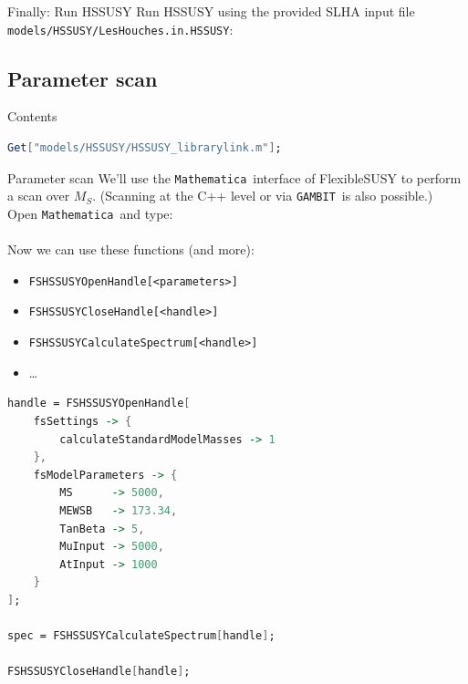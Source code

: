 \documentclass[hyperref={pdfpagelabels=false},ngerman]{beamer}
\newcommand{\MS}{\ensuremath{M_S}}
\newcommand{\Mathematica}{\texttt{Mathematica}}
\newcommand{\GAMBIT}{\texttt{GAMBIT}}
\begin{document}
\begin{frame}{Finally: Run HSSUSY}
  Run HSSUSY using the provided SLHA input file
  \lstinline{models/HSSUSY/LesHouches.in.HSSUSY}:\\[2em]
  \usebox{\listbox}
\end{frame}

\subsection{Parameter scan}

\begin{frame}{Contents}
  \tableofcontents[currentsubsection,sectionstyle=show/shaded]  
\end{frame}

\begin{lrbox}{\listbox}\begin{lstlisting}[language=Mathematica]
Get["models/HSSUSY/HSSUSY_librarylink.m"];
\end{lstlisting}\end{lrbox} %

\begin{frame}{Parameter scan}
  We'll use the \Mathematica\ interface of FlexibleSUSY to perform a
  scan over $\MS$.  (Scanning at the C++ level or via \GAMBIT\ is also possible.)\\[1em]
  Open \Mathematica\ and type:\\[2em]
  \usebox{\listbox}
  \\[1em]
  Now we can use these functions (and more):\\
  \begin{itemize}
  \item[] \texttt{FSHSSUSYOpenHandle[<parameters>]}
  \item[] \texttt{FSHSSUSYCloseHandle[<handle>]}
  \item[] \texttt{FSHSSUSYCalculateSpectrum[<handle>]}
  \item[] \ldots
  \end{itemize}
\end{frame}

\begin{lrbox}{\listbox}\begin{lstlisting}[language=Mathematica]
handle = FSHSSUSYOpenHandle[
    fsSettings -> {
        calculateStandardModelMasses -> 1
    },
    fsModelParameters -> {
        MS      -> 5000,
        MEWSB   -> 173.34,
        TanBeta -> 5,
        MuInput -> 5000,
        AtInput -> 1000
    }
];

spec = FSHSSUSYCalculateSpectrum[handle];

FSHSSUSYCloseHandle[handle];
\end{lstlisting}\end{lrbox} %
\end{document}

